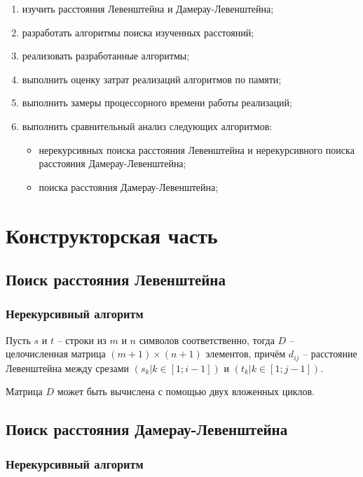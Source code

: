 \documentclass[oneside, a4paper, 12pt]{article}
\begin{document}
\begin{enumerate}
    \item изучить расстояния Левенштейна и Дамерау-Левенштейна;
    \item разработать алгоритмы поиска изученных расстояний;
    \item реализовать разработанные алгоритмы;
    \item выполнить оценку затрат реализаций алгоритмов по памяти;
    \item выполнить замеры процессорного времени работы реализаций;
    \item выполнить сравнительный анализ следующих алгоритмов:
    \begin{itemize}
        \item нерекурсивных поиска расстояния Левенштейна и
            нерекурсивного поиска расстояния Дамерау-Левенштейна;
        \item поиска расстояния Дамерау-Левенштейна;
    \end{itemize}
\end{enumerate}

\section{Конструкторская часть}

\subsection{Поиск расстояния Левенштейна}

\subsubsection{Нерекурсивный алгоритм}

Пусть $s$ и $t$ -- строки из $m$ и $n$ символов соответственно,
тогда $D$ -- целочисленная матрица $(m + 1) \times (n + 1)$
элементов, причём $d_{ij}$ -- расстояние Левенштейна между срезами
$(s_k | k \in [1; i - 1])$ и $(t_k | k \in [1; j - 1])$.

Матрица $D$ может быть вычислена с помощью двух вложенных циклов.

\subsection{Поиск расстояния Дамерау-Левенштейна}

\subsubsection{Нерекурсивный алгоритм}
\end{document}
